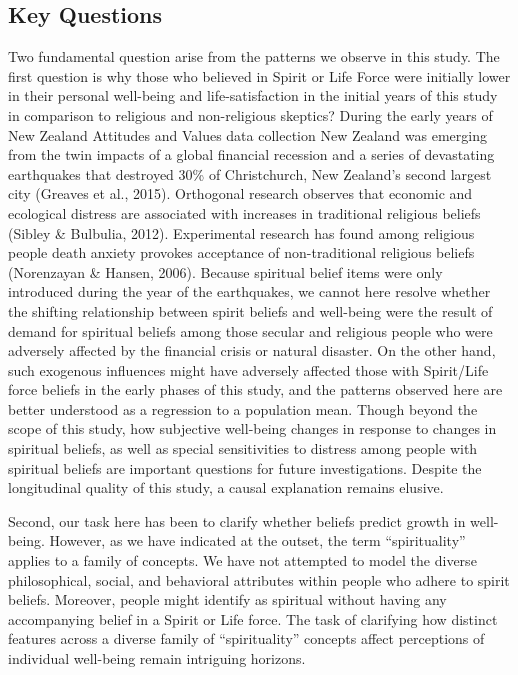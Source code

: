 \documentclass[
  english,
  man,floatsintext]{apa6}
\begin{document}
\hypertarget{key-questions}{%
\subsection{Key Questions}\label{key-questions}}

Two fundamental question arise from the patterns we observe in this study. The first question is why those who believed in Spirit or Life Force were initially lower in their personal well-being and life-satisfaction in the initial years of this study in comparison to religious and non-religious skeptics? During the early years of New Zealand Attitudes and Values data collection New Zealand was emerging from the twin impacts of a global financial recession and a series of devastating earthquakes that destroyed 30\% of Christchurch, New Zealand's second largest city (Greaves et al., 2015). Orthogonal research observes that economic and ecological distress are associated with increases in traditional religious beliefs (Sibley \& Bulbulia, 2012). Experimental research has found among religious people death anxiety provokes acceptance of non-traditional religious beliefs (Norenzayan \& Hansen, 2006). Because spiritual belief items were only introduced during the year of the earthquakes, we cannot here resolve whether the shifting relationship between spirit beliefs and well-being were the result of demand for spiritual beliefs among those secular and religious people who were adversely affected by the financial crisis or natural disaster. On the other hand, such exogenous influences might have adversely affected those with Spirit/Life force beliefs in the early phases of this study, and the patterns observed here are better understood as a regression to a population mean. Though beyond the scope of this study, how subjective well-being changes in response to changes in spiritual beliefs, as well as special sensitivities to distress among people with spiritual beliefs are important questions for future investigations. Despite the longitudinal quality of this study, a causal explanation remains elusive.

Second, our task here has been to clarify whether beliefs predict growth in well-being. However, as we have indicated at the outset, the term \enquote{spirituality} applies to a family of concepts. We have not attempted to model the diverse philosophical, social, and behavioral attributes within people who adhere to spirit beliefs. Moreover, people might identify as spiritual without having any accompanying belief in a Spirit or Life force. The task of clarifying how distinct features across a diverse family of \enquote{spirituality} concepts affect perceptions of individual well-being remain intriguing horizons.
\end{document}
